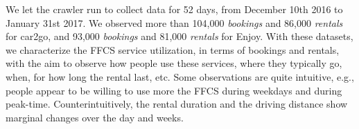 We let the crawler run to collect data for 52 days, from December 10th 2016 to January 31st 2017. We observed more than 104,000 \textit{bookings} and 86,000 \textit{rentals} for car2go, and 93,000 \textit{bookings} and 81,000 \textit{rentals} for Enjoy. 
With these datasets, we characterize the FFCS service utilization, in terms of bookings and rentals, with the aim to observe how people use these services, where they typically go, when, for how long the rental last, etc. Some observations are quite intuitive, e.g., people appear to be willing to use more the FFCS during weekdays and during peak-time. Counterintuitively, the rental duration and the driving distance show marginal changes over the day and weeks.



